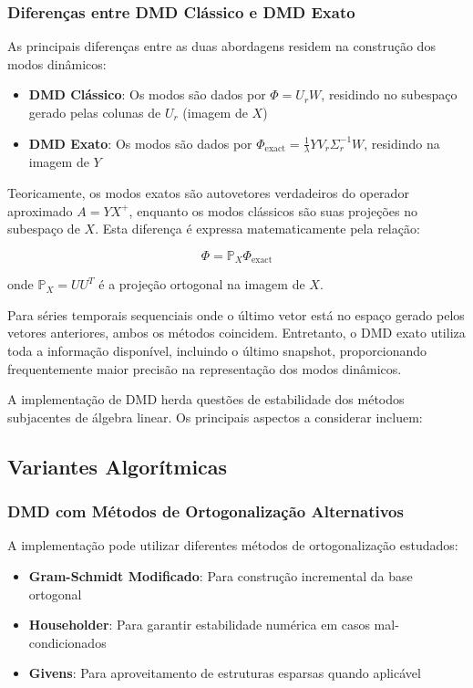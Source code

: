 \documentclass[a4,11pt]{pssbmac}
\begin{document}
\subsubsection{Diferenças entre DMD Clássico e DMD Exato}

As principais diferenças entre as duas abordagens residem na construção dos modos dinâmicos:

\begin{itemize}
\item \textbf{DMD Clássico}: Os modos são dados por $\Phi = U_r W$, residindo no subespaço gerado pelas colunas de $U_r$ (imagem de $X$)
\item \textbf{DMD Exato}: Os modos são dados por $\Phi_{\text{exact}} = \frac{1}{\lambda} Y V_r \Sigma_r^{-1} W$, residindo na imagem de $Y$
\end{itemize}

Teoricamente, os modos exatos são autovetores verdadeiros do operador aproximado $A = YX^+$, enquanto os modos clássicos são suas projeções no subespaço de $X$. Esta diferença é expressa matematicamente pela relação:

\begin{equation}
\Phi = \mathbb{P}_X \Phi_{\text{exact}}
\end{equation}

onde $\mathbb{P}_X = UU^T$ é a projeção ortogonal na imagem de $X$.

Para séries temporais sequenciais onde o último vetor está no espaço gerado pelos vetores anteriores, ambos os métodos coincidem. Entretanto, o DMD exato utiliza toda a informação disponível, incluindo o último snapshot, proporcionando frequentemente maior precisão na representação dos modos dinâmicos.

A implementação de DMD herda questões de estabilidade dos métodos subjacentes de álgebra linear. Os principais aspectos a considerar incluem:

\subsection{Variantes Algorítmicas}

\subsubsection{DMD com Métodos de Ortogonalização Alternativos}
A implementação pode utilizar diferentes métodos de ortogonalização estudados:

\begin{itemize}
\item \textbf{Gram-Schmidt Modificado}: Para construção incremental da base ortogonal
\item \textbf{Householder}: Para garantir estabilidade numérica em casos mal-condicionados
\item \textbf{Givens}: Para aproveitamento de estruturas esparsas quando aplicável
\end{itemize}
\end{document}
